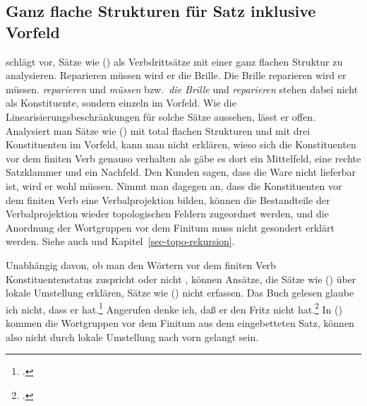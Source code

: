 


\subsection{Ganz flache Strukturen für Satz inklusive Vorfeld}
\label{sec-pvp-vdrei}

\citet[--171]{Gunkel2003b} schlägt vor, Sätze wie () als Verbdrittsätze
mit einer ganz flachen Struktur zu analysieren.
\eal
\ex Reparieren müssen wird er die Brille.
\ex Die Brille reparieren wird er müssen.
\zl 
\emph{reparieren} und \emph{müssen} bzw.\ \emph{die Brille} und \emph{reparieren}
stehen dabei nicht als Konstituente, sondern einzeln im Vorfeld.
Wie die Linearisierungsbeschränkungen
für solche Sätze aussehen, lässt er offen. Analysiert man Sätze wie () mit total
flachen Strukturen und mit drei Konstituenten im Vorfeld, kann man nicht erklären,
wieso sich die Konstituenten vor dem finiten Verb genauso verhalten als gäbe es dort
ein Mittelfeld, eine rechte Satzklammer und ein Nachfeld.
\ea
Den Kunden sagen, dass die Ware nicht lieferbar ist, wird er wohl müssen.
\z
Nimmt man dagegen an, dass die Konstituenten vor dem finiten Verb eine Verbalprojektion
bilden, können die Bestandteile der Verbalprojektion wieder topologischen Feldern
zugeordnet werden, und die Anordnung der Wortgruppen vor dem Finitum muss nicht gesondert
erklärt werden. Siehe auch  und Kapitel~\ref{sec-topo-rekursion}.

Unabhängig davon, ob man den Wörtern vor dem finiten Verb Konstituentenstatus
zuspricht \citep{Kathol95a} oder nicht \citep{Gunkel2003b}, können Ansätze,
die Sätze wie () über lokale Umstellung erklären, Sätze wie ()
nicht erfassen.
\eal
\ex Das Buch gelesen glaube ich nicht, dass er hat.\footnote{
  .
}
\ex Angerufen denke ich, daß er den Fritz nicht hat.\footnote{
  .
}
\zl
In () kommen die Wortgruppen vor dem Finitum aus dem eingebetteten Satz,
können also nicht durch lokale Umstellung nach vorn gelangt sein.

